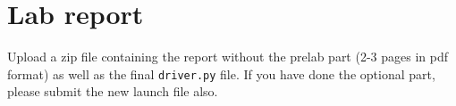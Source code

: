 \documentclass[a4paper,10pt]{article}
\begin{document}
\section{Lab report}

Upload a zip file containing the report without the prelab part (2-3 pages in pdf format) as well as the final \texttt{driver.py} file. If you have done the optional part, please submit the new launch file also.
\end{document}
